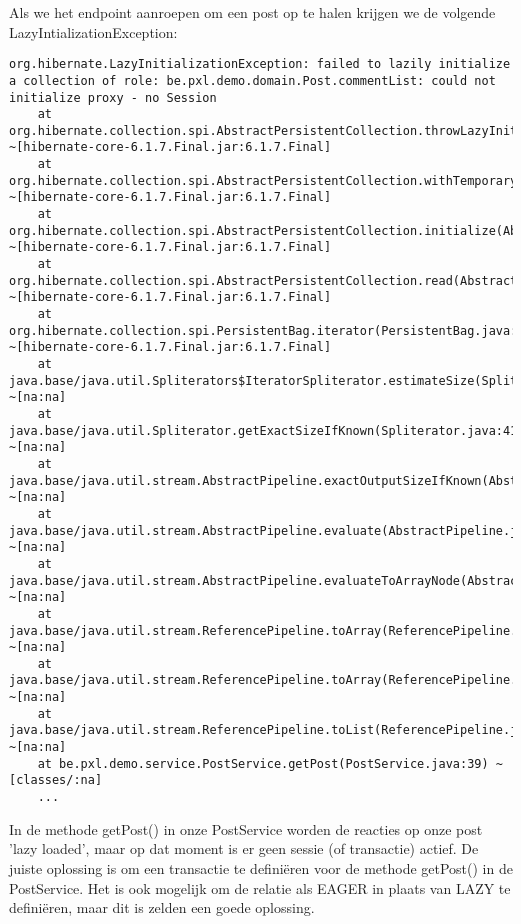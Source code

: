 Als we het endpoint aanroepen om een post op te halen krijgen we de volgende LazyIntializationException: 

\begin{lstlisting}[basicstyle=\tiny]
org.hibernate.LazyInitializationException: failed to lazily initialize a collection of role: be.pxl.demo.domain.Post.commentList: could not initialize proxy - no Session
	at org.hibernate.collection.spi.AbstractPersistentCollection.throwLazyInitializationException(AbstractPersistentCollection.java:635) ~[hibernate-core-6.1.7.Final.jar:6.1.7.Final]
	at org.hibernate.collection.spi.AbstractPersistentCollection.withTemporarySessionIfNeeded(AbstractPersistentCollection.java:218) ~[hibernate-core-6.1.7.Final.jar:6.1.7.Final]
	at org.hibernate.collection.spi.AbstractPersistentCollection.initialize(AbstractPersistentCollection.java:615) ~[hibernate-core-6.1.7.Final.jar:6.1.7.Final]
	at org.hibernate.collection.spi.AbstractPersistentCollection.read(AbstractPersistentCollection.java:136) ~[hibernate-core-6.1.7.Final.jar:6.1.7.Final]
	at org.hibernate.collection.spi.PersistentBag.iterator(PersistentBag.java:366) ~[hibernate-core-6.1.7.Final.jar:6.1.7.Final]
	at java.base/java.util.Spliterators$IteratorSpliterator.estimateSize(Spliterators.java:1865) ~[na:na]
	at java.base/java.util.Spliterator.getExactSizeIfKnown(Spliterator.java:414) ~[na:na]
	at java.base/java.util.stream.AbstractPipeline.exactOutputSizeIfKnown(AbstractPipeline.java:470) ~[na:na]
	at java.base/java.util.stream.AbstractPipeline.evaluate(AbstractPipeline.java:574) ~[na:na]
	at java.base/java.util.stream.AbstractPipeline.evaluateToArrayNode(AbstractPipeline.java:260) ~[na:na]
	at java.base/java.util.stream.ReferencePipeline.toArray(ReferencePipeline.java:616) ~[na:na]
	at java.base/java.util.stream.ReferencePipeline.toArray(ReferencePipeline.java:622) ~[na:na]
	at java.base/java.util.stream.ReferencePipeline.toList(ReferencePipeline.java:627) ~[na:na]
	at be.pxl.demo.service.PostService.getPost(PostService.java:39) ~[classes/:na]
	...
\end{lstlisting}

In de methode getPost() in onze PostService worden de reacties op onze post 'lazy loaded', maar op dat moment is er geen sessie (of transactie) actief.
De juiste oplossing is om een transactie te definiëren voor de methode getPost() in de PostService. Het is ook mogelijk om de relatie als EAGER in plaats van LAZY te definiëren, maar dit is zelden een goede oplossing.


